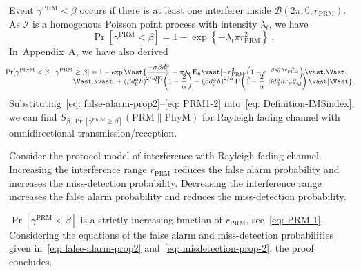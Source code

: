 \documentclass[12pt, draftclsnofoot, onecolumn]{IEEEtran}
\begin{document}
Event $\gamma^{\mathrm{PRM}} < \beta$ occurs if there is at least one interferer inside $\mathcal{B}(2\pi,0,r_{\mathrm{PRM}})$. As $\mathcal{I}$ is a homogenous Poisson point process with intensity $ \lambda_t$, we have
\begin{equation}\label{eq: PRM-1}
\Pr \left[\gamma^{\mathrm{PRM}} < \beta \right] = 1 - \exp\left\{-\lambda_t \pi r_{\mathrm{PRM}}^2\right\} \:.
\end{equation}
In~Appendix~A, we have also derived
\begin{align}\label{eq: PRM1-2}
\hspace{-2mm}\Pr[\gamma^{\mathrm{PhyM}} < \beta \mid \gamma^{\mathrm{PRM}} \geq \beta]  &= 1 - \exp\Vast\{ \frac{- \sigma \beta d_{0}^{\alpha}}{pc} - \pi \lambda_t \, \mathbf{E}_h \vast[ - r_{\mathrm{PRM}}^2 \left( 1 - e^{- \beta d_{0}^{\alpha} h r_{\mathrm{PRM}}^{-\alpha}} \right) \vast. \Vast. \nonumber \\[-5mm]
& \hspace{-8mm} \Vast. \vast.
+ \left( \beta d_{0}^{\alpha} h \right)^{2/\alpha} \Gamma\left( 1 - \frac{2}{\alpha} \right)- \left( \beta d_{0}^{\alpha} h \right)^{2/\alpha} \Gamma\left( 1 - \frac{2}{\alpha}, \beta d_{0}^{\alpha} h r_{\mathrm{PRM}}^{-\alpha} \right) \vast] \Vast\}  \:.
\end{align}
Substituting~\eqref{eq: false-alarm-prop2}--\eqref{eq: PRM1-2} into~\eqref{eq: Definition-IMSindex}, we can find $S_{\beta,\Pr \left[ \gamma^{\mathrm{PhyM}} \geq \beta \right]}\left(\mathrm{PRM}\|\mathrm{PhyM} \right)$ for Rayleigh fading channel with omnidirectional transmission/reception.

\begin{result}\label{result: Pmd-Pfa-tradeoff}
Consider the protocol model of interference with Rayleigh fading channel. Increasing the interference range $r_{\mathrm{PRM}}$ reduces the false alarm probability and increases the miss-detection probability. Decreasing the interference range increases the false alarm probability and reduces the miss-detection probability.
\end{result}

\begin{IEEEproof}
$\Pr \left[\gamma^{\mathrm{PRM}} < \beta \right]$ is a strictly increasing function of $r_{\mathrm{PRM}}$, see~\eqref{eq: PRM-1}.
Considering the equations of the false alarm and miss-detection probabilities given in~\eqref{eq: false-alarm-prop2} and~\eqref{eq: misdetection-prop-2}, the proof concludes.
\end{IEEEproof}
\end{document}
